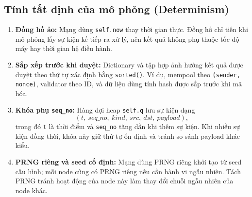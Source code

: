 \subsection{Tính tất định của mô phỏng (Determinism)}

\begin{enumerate}
    \item \textbf{Đồng hồ ảo:} Mạng dùng \texttt{self.now} thay thời gian thực. Đồng hồ chỉ tiến khi mô phỏng lấy sự kiện kế tiếp ra xử lý, nên kết quả không phụ thuộc tốc độ máy hay thời gian hệ điều hành.
    \item \textbf{Sắp xếp trước khi duyệt:} Dictionary và tập hợp ảnh hưởng kết quả được duyệt theo thứ tự xác định bằng \texttt{sorted()}. Ví dụ, mempool theo \texttt{(sender, nonce)}, validator theo ID, và dữ liệu dùng tính hash được sắp trước khi mã hóa.
    \item \textbf{Khóa phụ \texttt{seq\_no}:} Hàng đợi heap \texttt{self.q} lưu sự kiện dạng
    \[
    (t,\ seq\_no,\ kind,\ src,\ dst,\ payload),
    \]
    trong đó \texttt{t} là thời điểm và \texttt{seq\_no} tăng dần khi thêm sự kiện. Khi nhiều sự kiện đồng thời, khóa này giữ thứ tự ổn định và tránh so sánh payload khác kiểu.
    \item \textbf{PRNG riêng và seed cố định:} Mạng dùng PRNG riêng khởi tạo từ seed cấu hình; mỗi node cũng có PRNG riêng nếu cần hành vi ngẫu nhiên. Tách PRNG tránh hoạt động của node này làm thay đổi chuỗi ngẫu nhiên của node khác.
\end{enumerate}
